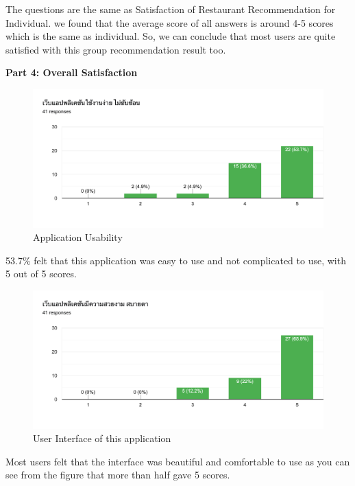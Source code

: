 \documentclass[12pt,oneside,openright,a4paper]{cpe-english-project}
\begin{document}
The questions are the same as Satisfaction of Restaurant Recommendation for Individual. we found that the average score of all answers is around 4-5 scores which is the same as individual. So, we can conclude that most users are quite satisfied with this group recommendation result too.

\newpage
\textbf{Part 4: Overall Satisfaction}\

\begin{figure}[H]\centering
\includegraphics[width=350pt]{./images/A2ApplicationUsability.png}
\caption{Application Usability}\label{fig:A2ApplicationUsability}
\end{figure}\vspace{-24pt}

53.7\% felt that this application was easy to use and not complicated to use, with 5 out of 5 scores.

\begin{figure}[H]\centering
\includegraphics[width=350pt]{./images/A2UserInterfaceofthisapplication.png}
\caption{User Interface of this application}\label{fig:A2UserInterfaceofthisapplication}
\end{figure}\vspace{-24pt}

Most users felt that the interface was beautiful and comfortable to use as you can see from the figure that more than half gave 5 scores.
\end{document}

